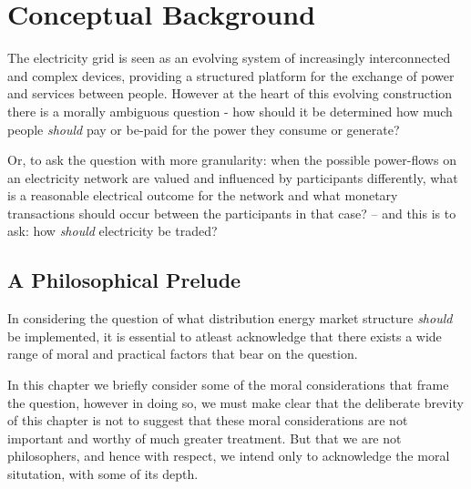 \section{Conceptual Background}
\label{cha:background}

The electricity grid is seen as an evolving system of increasingly interconnected and complex devices, providing a structured platform for the exchange of power and services between people.
However at the heart of this evolving construction there is a morally ambiguous question - how should it be determined how much people \textit{should} pay or be-paid for the power they consume or generate?

Or, to ask the question with more granularity: when the possible power-flows on an electricity network are valued and influenced by participants differently, 
what is a reasonable electrical outcome for the network and what monetary transactions should occur between the participants in that case? -- and this is to ask: how \textit{should} electricity be traded?\\


\subsection{A Philosophical Prelude}


In considering the question of what distribution energy market structure \textit{should} be implemented, it is essential to atleast acknowledge that there exists a wide range of moral and practical factors that bear on the question.

In this chapter we briefly consider some of the moral considerations that frame the question, however in doing so, we must make clear that the deliberate brevity of this chapter is not to suggest that these moral considerations are not important and worthy of much greater treatment. But that we are not philosophers, and hence with respect, we intend only to acknowledge the moral situtation, with some of its depth.

